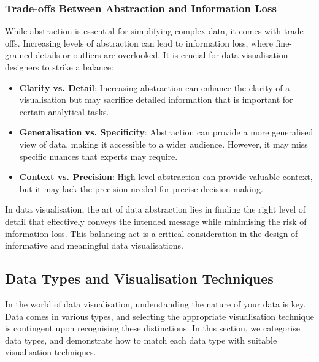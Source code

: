 \documentclass{article}\usepackage[]{graphicx}\usepackage[]{xcolor}
\begin{document}
\subsubsection{Trade-offs Between Abstraction and Information Loss}
While abstraction is essential for simplifying complex data, it comes with trade-offs. Increasing levels of abstraction can lead to information loss, where fine-grained details or outliers are overlooked. It is crucial for data visualisation designers to strike a balance:
\begin{itemize}
    \item \textbf{Clarity vs. Detail}: Increasing abstraction can enhance the clarity of a visualisation but may sacrifice detailed information that is important for certain analytical tasks.
    \item \textbf{Generalisation vs. Specificity}: Abstraction can provide a more generalised view of data, making it accessible to a wider audience. However, it may miss specific nuances that experts may require.
    \item \textbf{Context vs. Precision}: High-level abstraction can provide valuable context, but it may lack the precision needed for precise decision-making.
\end{itemize}
In data visualisation, the art of data abstraction lies in finding the right level of detail that effectively conveys the intended message while minimising the risk of information loss. This balancing act is a critical consideration in the design of informative and meaningful data visualisations.

\subsection{Data Types and Visualisation Techniques}
In the world of data visualisation, understanding the nature of your data is key. Data comes in various types, and selecting the appropriate visualisation technique is contingent upon recognising these distinctions. In this section, we categorise data types, and demonstrate how to match each data type with suitable visualisation techniques.
\end{document}
